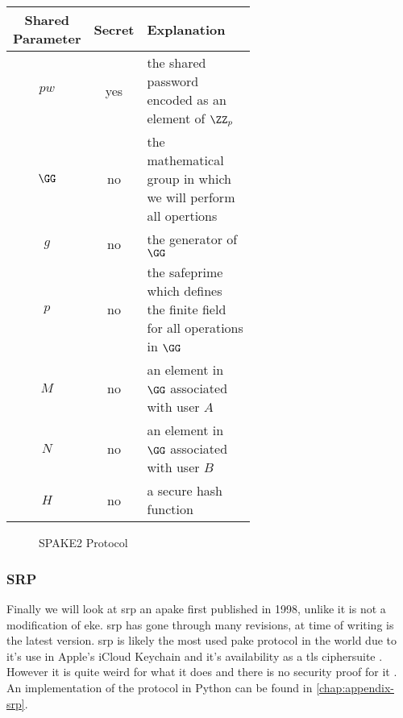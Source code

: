 \begin{center}
  \begin{tabular}{ ccp{0.6\linewidth} }
    \toprule
    Shared Parameter & Secret & Explanation \\
    \midrule
    $pw$ & yes & the shared password encoded as an element of $\ZZ_p$ \\
    $\GG$ & no & the mathematical group in which we will perform all opertions \\ 
    $g$ & no & the generator of $\GG$ \\
    $p$ & no & the \gls{safeprime} which defines the finite field for all operations in $\GG$ \\
    $M$ & no & an element in $\GG$ associated with user $A$ \\
    $N$ & no & an element in $\GG$ associated with user $B$ \\
    $H$ & no & a secure hash function \\
    \bottomrule
  \end{tabular}
\end{center}

\begin{figure}[H]

  \caption{SPAKE2 Protocol}
  \label{fig:spake2}
\end{figure}

\clearpage

\subsubsection{SRP}
Finally we will look at \gls{srp} an \gls{apake} first published in 1998, unlike  it is not a modification of \gls{eke}.
\gls{srp} has gone through many revisions, at time of writing  is the latest version.
\gls{srp} is likely the most used \gls{pake} protocol in the world due to it's use in Apple's iCloud Keychain \cite{apple-keychain-srp} and it's availability as a \gls{tls} ciphersuite \cite{tls-srp}.
However it is quite weird for what it does and there is no security proof for it \cite{srp-blog}. An implementation of the protocol in Python can be found in \cref{chap:appendix-srp}.

